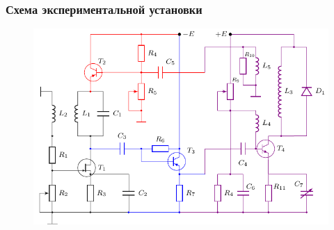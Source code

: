\begin{frame}%
	\frametitle{Схема экспериментальной установки}
	\begin{figure}[h]
		\includegraphics[]{img/img_6}
	\end{figure}
\end{frame}
